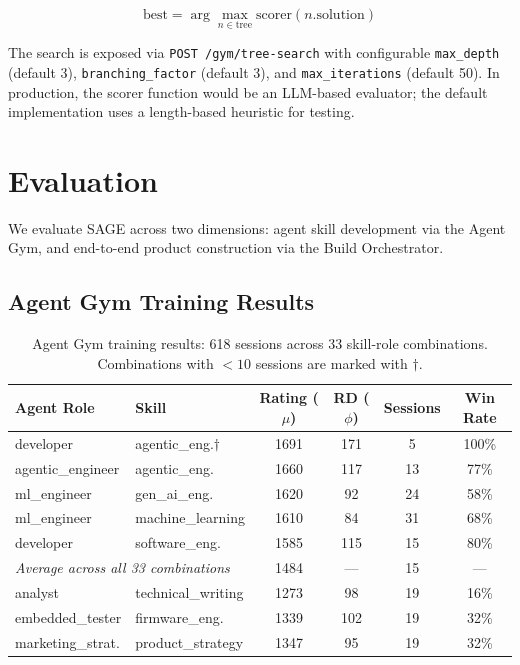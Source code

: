 \documentclass[11pt,a4paper]{article}
\begin{document}
\begin{equation}
\text{best} = \arg\max_{n \in \text{tree}} \text{scorer}(n.\text{solution})
\label{eq:bfts}
\end{equation}

The search is exposed via \texttt{POST /gym/tree-search} with configurable \texttt{max\_depth} (default 3), \texttt{branching\_factor} (default 3), and \texttt{max\_iterations} (default 50). In production, the scorer function would be an LLM-based evaluator; the default implementation uses a length-based heuristic for testing.

\section{Evaluation}
\label{sec:evaluation}

We evaluate SAGE across two dimensions: agent skill development via the Agent Gym, and end-to-end product construction via the Build Orchestrator.

\subsection{Agent Gym Training Results}

\begin{table}[h]
\centering
\caption{Agent Gym training results: 618 sessions across 33 skill-role combinations. Combinations with $<10$ sessions are marked with $\dagger$.}
\label{tab:gym-results}
\begin{tabular}{llcccc}
\toprule
\textbf{Agent Role} & \textbf{Skill} & \textbf{Rating ($\mu$)} & \textbf{RD ($\phi$)} & \textbf{Sessions} & \textbf{Win Rate} \\
\midrule
developer & agentic\_eng.$\dagger$ & 1691 & 171 & 5 & 100\% \\
agentic\_engineer & agentic\_eng. & 1660 & 117 & 13 & 77\% \\
ml\_engineer & gen\_ai\_eng. & 1620 & 92 & 24 & 58\% \\
ml\_engineer & machine\_learning & 1610 & 84 & 31 & 68\% \\
developer & software\_eng. & 1585 & 115 & 15 & 80\% \\
\midrule
\multicolumn{2}{l}{\textit{Average across all 33 combinations}} & 1484 & --- & 15 & --- \\
\midrule
analyst & technical\_writing & 1273 & 98 & 19 & 16\% \\
embedded\_tester & firmware\_eng. & 1339 & 102 & 19 & 32\% \\
marketing\_strat. & product\_strategy & 1347 & 95 & 19 & 32\% \\
\bottomrule
\end{tabular}
\end{table}
\end{document}
